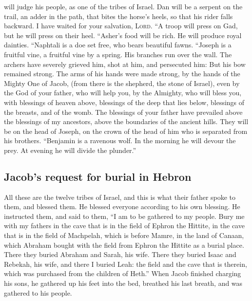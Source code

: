 will judge his people, as one of the tribes of Israel. 
Dan will be a serpent on the trail, an adder in the path, that bites the
horse's heels, so that his rider falls backward.  I have
waited for your salvation, \textsc{Lord}.  ``A troop will
press on Gad, but he will press on their heel.  ``Asher's
food will be rich. He will produce royal dainties. 
``Naphtali is a doe set free, who bears beautiful fawns. 
``Joseph is a fruitful vine, a fruitful vine by a spring. His branches
run over the wall.  The archers have severely grieved
him, shot at him, and persecuted him:  But his bow
remained strong. The arms of his hands were made strong, by the hands of
the Mighty One of Jacob, (from there is the shepherd, the stone of
Israel),  even by the God of your father, who will help
you, by the Almighty, who will bless you, with blessings of heaven
above, blessings of the deep that lies below, blessings of the breasts,
and of the womb.  The blessings of your father have
prevailed above the blessings of my ancestors, above the boundaries of
the ancient hills. They will be on the head of Joseph, on the crown of
the head of him who is separated from his brothers. 
``Benjamin is a ravenous wolf. In the morning he will devour the prey.
At evening he will divide the plunder.''

\hypertarget{jacobs-request-for-burial-in-hebron}{%
\subsection{Jacob's request for burial in
Hebron}\label{jacobs-request-for-burial-in-hebron}}

 All these are the twelve tribes of Israel, and this is
what their father spoke to them, and blessed them. He blessed everyone
according to his own blessing.  He instructed them, and
said to them, ``I am to be gathered to my people. Bury me with my
fathers in the cave that is in the field of Ephron the Hittite,
 in the cave that is in the field of Machpelah, which is
before Mamre, in the land of Canaan, which Abraham bought with the field
from Ephron the Hittite as a burial place.  There they
buried Abraham and Sarah, his wife. There they buried Isaac and Rebekah,
his wife, and there I buried Leah:  the field and the
cave that is therein, which was purchased from the children of Heth.''
 When Jacob finished charging his sons, he gathered up
his feet into the bed, breathed his last breath, and was gathered to his
people.

